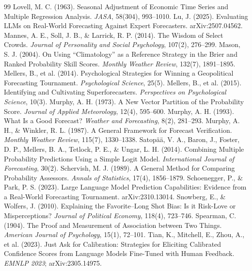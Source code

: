 \documentclass[11pt]{article}
\begin{document}
\begin{thebibliography}{99}
 Lovell, M. C. (1963). Seasonal Adjustment of Economic Time Series and Multiple Regression Analysis. \emph{JASA}, 58(304), 993--1010.
 Lu, J. (2025). Evaluating LLMs on Real-World Forecasting Against Expert Forecasters. arXiv:2507.04562.
 Mannes, A. E., Soll, J. B., \& Larrick, R. P. (2014). The Wisdom of Select Crowds. \emph{Journal of Personality and Social Psychology}, 107(2), 276--299.
 Mason, S. J. (2004). On Using ``Climatology'' as a Reference Strategy in the Brier and Ranked Probability Skill Scores. \emph{Monthly Weather Review}, 132(7), 1891--1895.
 Mellers, B., et al. (2014). Psychological Strategies for Winning a Geopolitical Forecasting Tournament. \emph{Psychological Science}, 25(5).
 Mellers, B., et al. (2015). Identifying and Cultivating Superforecasters. \emph{Perspectives on Psychological Science}, 10(3).
 Murphy, A. H. (1973). A New Vector Partition of the Probability Score. \emph{Journal of Applied Meteorology}, 12(4), 595--600.
 Murphy, A. H. (1993). What Is a Good Forecast? \emph{Weather and Forecasting}, 8(2), 281--293.
 Murphy, A. H., \& Winkler, R. L. (1987). A General Framework for Forecast Verification. \emph{Monthly Weather Review}, 115(7), 1330--1338.
 Satop\"a\"a, V. A., Baron, J., Foster, D. P., Mellers, B. A., Tetlock, P. E., \& Ungar, L. H. (2014). Combining Multiple Probability Predictions Using a Simple Logit Model. \emph{International Journal of Forecasting}, 30(2).
 Schervish, M. J. (1989). A General Method for Comparing Probability Assessors. \emph{Annals of Statistics}, 17(4), 1856--1879.
 Schoenegger, P., \& Park, P. S. (2023). Large Language Model Prediction Capabilities: Evidence from a Real-World Forecasting Tournament. arXiv:2310.13014.
 Snowberg, E., \& Wolfers, J. (2010). Explaining the Favorite--Long Shot Bias: Is it Risk-Love or Misperceptions? \emph{Journal of Political Economy}, 118(4), 723--746.
 Spearman, C. (1904). The Proof and Measurement of Association between Two Things. \emph{American Journal of Psychology}, 15(1), 72--101.
 Tian, K., Mitchell, E., Zhou, A., et al. (2023). Just Ask for Calibration: Strategies for Eliciting Calibrated Confidence Scores from Language Models Fine-Tuned with Human Feedback. \emph{EMNLP 2023}; arXiv:2305.14975.

\end{thebibliography}
\end{document}
